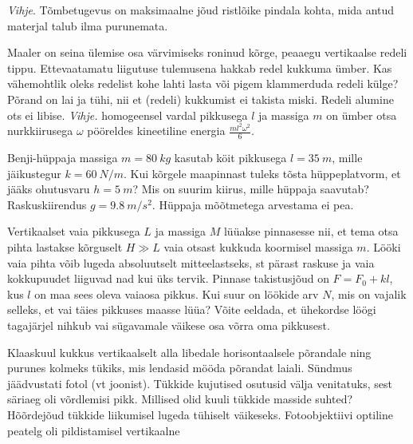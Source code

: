 \documentclass[10pt]{article}
\begin{document}
{\emph{Vihje}. Tõmbetugevus on maksimaalne jõud ristlõike pindala kohta, mida antud materjal talub ilma purunemata.
\probend
\bigskip


Maaler on seina ülemise osa värvimiseks roninud kõrge, peaaegu vertikaalse
redeli tippu. Ettevaatamatu liigutuse tulemusena hakkab redel kukkuma ümber. Kas
vähemohtlik oleks redelist kohe lahti lasta või pigem klammerduda redeli külge?
Põrand on lai ja tühi, nii et (redeli) kukkumist ei takista miski. Redeli alumine
ots ei libise.
\emph{Vihje.} homogeensel vardal pikkusega $l$ ja massiga $m$ on ümber otsa
nurkkiirusega $\omega$ pööreldes kineetiline energia $\frac{m l^2 \omega^2}{6}$.
\probend
\bigskip


Benji-hüppaja massiga $m=\SI{80}{kg}$ kasutab köit pikkusega $l=\SI{35}{m}$, mille jäikustegur $k=\SI{60}{N/m}$. Kui kõrgele maapinnast tuleks tõsta hüppeplatvorm, et jääks ohutusvaru $h=\SI{5}{m}$? Mis on suurim kiirus, mille hüppaja saavutab? Raskuskiirendus $g=\SI{9.8}{m/s^2}$. Hüppaja mõõtmetega arvestama ei pea.
\probend
\bigskip


Vertikaalset vaia pikkusega $L$ ja massiga $M$ lüüakse pinnasesse nii, et tema otsa pihta lastakse kõrguselt $H\gg L$ vaia otsast kukkuda koormisel massiga $m$. Lööki vaia pihta võib lugeda absoluutselt mitteelastseks, st pärast raskuse ja vaia kokkupuudet liiguvad nad kui üks tervik. Pinnase takistusjõud on $F = F_0 + kl$, kus $l$ on maa sees oleva vaiaosa pikkus. Kui suur on löökide arv $N$, mis on vajalik selleks, et vai täies pikkuses maasse lüüa? Võite eeldada, et ühekordse löögi tagajärjel nihkub vai sügavamale väikese osa võrra oma pikkusest.
\probend
\bigskip


Klaaskuul kukkus vertikaalselt alla libedale horisontaalsele põrandale ning purunes kolmeks tükiks, mis lendasid mööda põrandat laiali. Sündmus jäädvustati fotol (vt joonist). Tükkide kujutised osutusid välja venitatuks, sest säriaeg oli võrdlemisi pikk. Millised olid kuuli tükkide masside suhted? Hõõrdejõud tükkide liikumisel lugeda tühiselt väikeseks. Fotoobjektiivi optiline peatelg oli pildistamisel vertikaalne

}
\end{document}
